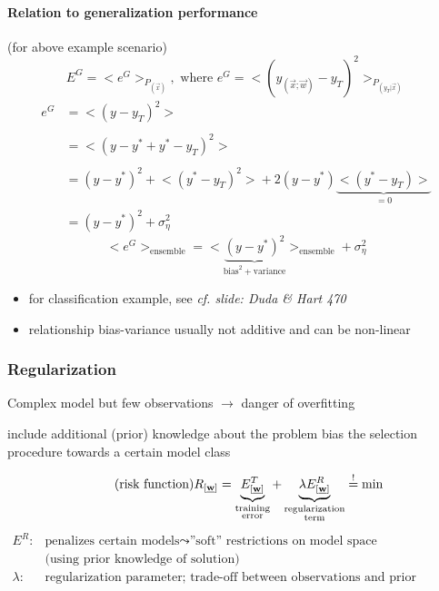 \paragraph{Relation to generalization performance} (for above example scenario)
\begin{equation}
	E^G = \big< e^G \big>_{P_{(\vec{x})}}, \text{ where } 
		e^G = \big< (y_{(\vec{x};\vec{w})} - y_T)^2 \big>_{
			P_{(y_T|\vec{x})}}
\end{equation}
\begin{equation}
	\begin{array}{ll}
	e^G
	& = \big< (y - y_T)^2 \big> \\\\
	& = \big< (y - y^* + y^* - y_T)^2 \big> \\\\
	& = (y - y^*)^2 + \big< (y^* - y_T)^2 \big> + 2(y - y^*) 
		\underbrace{ \big< (y^* - y_T) \big> }_{= 0} \\
	& = (y - y^*)^2 + \sigma_{\eta}^2
	\end{array}
\end{equation}
\begin{equation}
	\big< e^G \big>_{\text{ensemble}} 
	= \big< \underbrace{(y - y^*)^2}_{\text{bias}^2 + \text{variance}}
		\big>_{ \text{ensemble}} + \sigma_{\eta}^2
\end{equation}
\begin{itemize}
\item for classification example, see {\it cf. slide: Duda \& Hart 470}
\item relationship bias-variance usually not additive and can be
  non-linear
\end{itemize}


\subsubsection{Regularization}
Complex model but few observations $\rightarrow$ danger of overfitting
\begin{itemize}
\itr include additional (prior) knowledge about the problem
\itr bias the selection procedure towards a certain model class
\end{itemize}
\begin{equation} \tag{risk function}
	R_{[\underline{\mathbf{w}}]} = \underbrace{ E_{[\underline{\mathbf{w}}]}^T }_{
			\substack{\text{training} \\ \text{error}}}
		+ \underbrace{ \lambda E_{[\underline{\mathbf{w}}]}^R }_{
			\substack{\text{regularization} \\ \text{term}}}
		\stackrel{\mathrm{!}}{=} \min 
\end{equation}
\[ \begin{array}{ll}
	E^R: & \text{penalizes certain models} \leadsto \text{''soft'' 
		restrictions on model space} \\
		& \text{(using prior knowledge of solution)}\\
	\lambda: & \text{regularization parameter; trade-off between 
		observations and prior knowledge}
\end{array} \]
